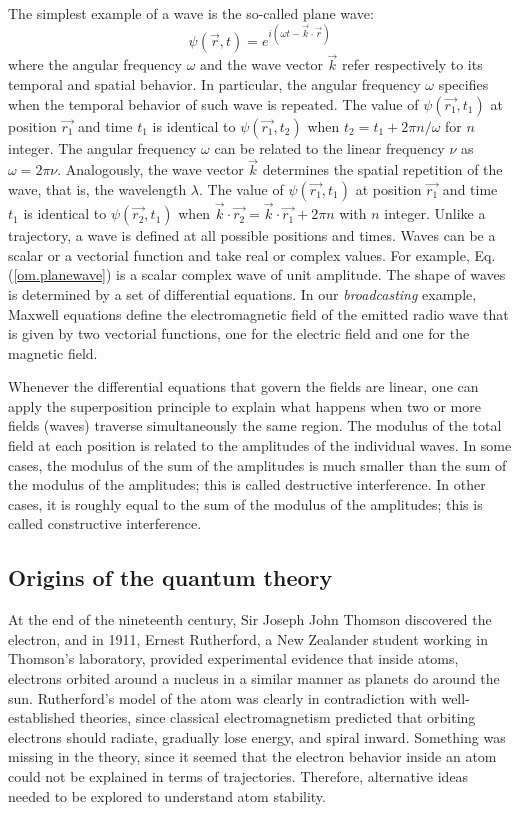 \documentclass[onecolumn,nofootinbib, secnumarabic, amsmath, nobibnotes,11pt,aps,pra]{revtex4-1}
\newcommand{\eref}[1]{Eq. (\ref{#1})}
\begin{document}
The simplest example of a wave is the so-called plane wave:
\begin{equation} \label{om.planewave}
\psi(\vec{r},t) = e^{i(\omega t- \vec{k} \cdot \vec{r})}
\end{equation}
where the angular frequency $\omega$ and the wave vector $\vec{k}$
refer respectively to its temporal and spatial behavior. In
particular, the angular frequency $\omega$ specifies when the
temporal behavior of such wave is repeated. The value of
$\psi(\vec{r_1},t_1) $ at position $\vec{r_1}$ and time $t_1$ is
identical to $\psi(\vec{r_1},t_2) $ when $t_2 = t_1 + 2 \pi
n/\omega$ for $n$ integer. The angular frequency $\omega$ can be
related to the linear frequency $\nu$ as $ \omega = 2 \pi \nu$.
Analogously, the wave vector $\vec{k}$ determines the spatial
repetition of the wave, that is, the wavelength $\lambda$. The value
of $\psi(\vec{r_1},t_1)$ at position $\vec{r_1}$ and time $t_1$ is
identical to $\psi(\vec{r_2},t_1)$ when $\vec{k}\cdot\vec{r_2} =
\vec{k}\cdot\vec{r_1} + 2 \pi n$ with $n$ integer. Unlike a
trajectory, a wave is defined at all possible positions and times.
Waves can be a scalar or a vectorial function and take real or
complex values. For example, \eref{om.planewave} is a scalar complex
wave of unit amplitude. The shape of waves is determined by a set of
differential equations. In our \textit{broadcasting} example,
Maxwell equations define the electromagnetic field of the emitted
radio wave that is given by two vectorial functions, one for the
electric field and one for the magnetic field.

Whenever the differential equations that govern the fields are
linear, one can apply the superposition principle to explain what
happens when two or more fields (waves) traverse simultaneously the
same region. The modulus of the total field at each position is
related to the amplitudes of the individual waves. In some cases,
the modulus of the sum of the amplitudes is much smaller than the
sum of the modulus of the amplitudes; this is called destructive
interference. In other cases, it is roughly equal to the sum of the
modulus of the amplitudes; this is called constructive  interference.

\subsection{Origins of the quantum theory}\label{om.sec_intro.2}

At the end of the nineteenth century, Sir Joseph John Thomson discovered the electron, and in 1911, Ernest Rutherford, a New Zealander student working in Thomson's laboratory, provided experimental evidence that inside atoms, electrons orbited around a nucleus in a similar manner as planets do around the sun.
Rutherford's model of the atom was clearly in contradiction with well-established theories, since classical electromagnetism predicted that orbiting electrons should radiate, gradually lose energy, and spiral inward.
Something was missing in the theory, since it seemed that the electron behavior inside an atom could not be explained in terms of trajectories. Therefore, alternative ideas needed to be explored to understand atom stability.
\end{document}

